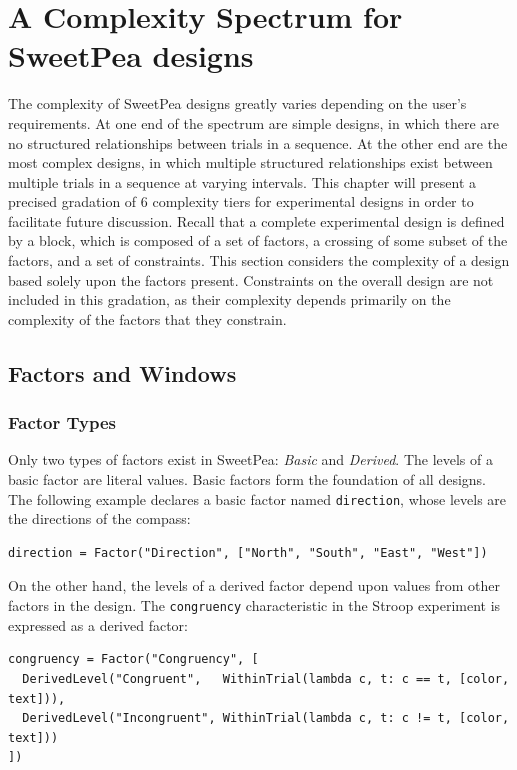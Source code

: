 
\chapter{A Complexity Spectrum for SweetPea designs}

The complexity of SweetPea designs greatly varies depending on the user's requirements. At one end of the spectrum are simple designs, in which there are no structured relationships between trials in a sequence. At the other end are the most complex designs, in which multiple structured relationships exist between multiple trials in a sequence at varying intervals. This chapter will present a precised gradation of 6 complexity tiers for experimental designs in order to facilitate future discussion. Recall that a complete experimental design is defined by a block, which is composed of a set of factors, a crossing of some subset of the factors, and a set of constraints. This section considers the complexity of a design based solely upon the factors present. Constraints on the overall design are not included in this gradation, as their complexity depends primarily on the complexity of the factors that they constrain.


\section{Factors and Windows}

\subsection{Factor Types}

Only two types of factors exist in SweetPea: \textit{Basic} and \textit{Derived}. The levels of a basic factor are literal values. Basic factors form the foundation of all designs. The following example declares a basic factor named \texttt{direction}, whose levels are the directions of the compass:

\begin{verbatim}
direction = Factor("Direction", ["North", "South", "East", "West"])
\end{verbatim}

On the other hand, the levels of a derived factor depend upon values from other factors in the design. The \texttt{congruency} characteristic in the Stroop experiment is expressed as a derived factor:

\begin{verbatim}
congruency = Factor("Congruency", [
  DerivedLevel("Congruent",   WithinTrial(lambda c, t: c == t, [color, text])),
  DerivedLevel("Incongruent", WithinTrial(lambda c, t: c != t, [color, text]))
])
\end{verbatim}

